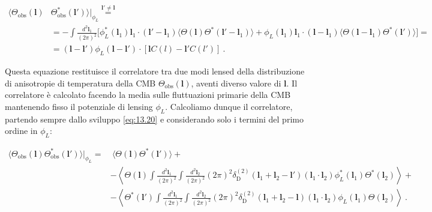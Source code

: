 \documentclass[a4paper,10pt]{article}
\newcommand{\B}{\boldsymbol}
\begin{document}
\begin{equation} \label{eq:13.23}
\begin{aligned}
    \langle \Theta_{\text{obs}}(\boldsymbol{l}) &\Theta_{\text{obs}}^*(\boldsymbol{l}') \rangle \Big|_{\phi_L} \overset{\boldsymbol{l}' \neq \boldsymbol{l}}{=} \\
    &= - \int \frac{d^2 \B l_1}{(2\pi)^2} \Big[ \phi_L^*(\boldsymbol{l}_1) \boldsymbol{l}_1 \cdot (\boldsymbol{l}' - \boldsymbol{l}_1) \langle \Theta(\boldsymbol{l}) \Theta^*(\boldsymbol{l}' - \boldsymbol{l}_1) \rangle + \phi_L(\boldsymbol{l}_1) \boldsymbol{l}_1 \cdot (\boldsymbol{l} - \boldsymbol{l}_1) \langle \Theta(\boldsymbol{l} - \boldsymbol{l}_1) \Theta^*(\boldsymbol{l}') \rangle \Big] = \\
    &= (\boldsymbol{l} - \boldsymbol{l}') \phi_L(\boldsymbol{l} - \boldsymbol{l}') \cdot [ \boldsymbol{l} C(l) - \boldsymbol{l}' C(l') ] \ .
\end{aligned}
\end{equation}

Questa equazione restituisce il correlatore tra due modi lensed della distribuzione di anisotropie di temperatura della CMB $\Theta_{\text{obs}}(\B l)$, aventi diverso valore di $\B l$.
Il correlatore è calcolato facendo la media sulle fluttuazioni primarie della CMB mantenendo fisso il potenziale di lensing $\phi_L$. Calcoliamo dunque il correlatore, partendo sempre dallo sviluppo \eqref{eq:13.20} e considerando solo i termini del primo ordine in $\phi_L$:

\begin{equation}
\begin{aligned}
    \langle \Theta_{\text{obs}}(\boldsymbol{l}) \Theta_{\text{obs}}^*(\boldsymbol{l}') \rangle \Big|_{\phi_L} =& \ \langle \Theta(\boldsymbol{l}) \Theta^*(\boldsymbol{l}') \rangle + \\
        & - \left\langle \Theta(\B l) \int \frac{d^2 \B l_1}{(2\pi)^2} \int \frac{d^2 \B l_2}{(2\pi)^2} (2\pi)^2 \delta_{\text{D}}^{(2)}(\boldsymbol{l}_1 + \boldsymbol{l}_2 - \boldsymbol{l}') (\boldsymbol{l}_1 \cdot \boldsymbol{l}_2) \phi_L^*(\boldsymbol{l}_1) \Theta^*(\boldsymbol{l}_2) \right\rangle + \\
        & - \left\langle \Theta^*(\B l') \int \frac{d^2 \B l_1}{(2\pi)^2} \int \frac{d^2 \B l_2}{(2\pi)^2} (2\pi)^2 \delta_{\text{D}}^{(2)}(\boldsymbol{l}_1 + \boldsymbol{l}_2 - \boldsymbol{l}) (\boldsymbol{l}_1 \cdot \boldsymbol{l}_2) \phi_L(\boldsymbol{l}_1) \Theta(\boldsymbol{l}_2) \right\rangle \ .
\end{aligned}
\end{equation}
\end{document}
